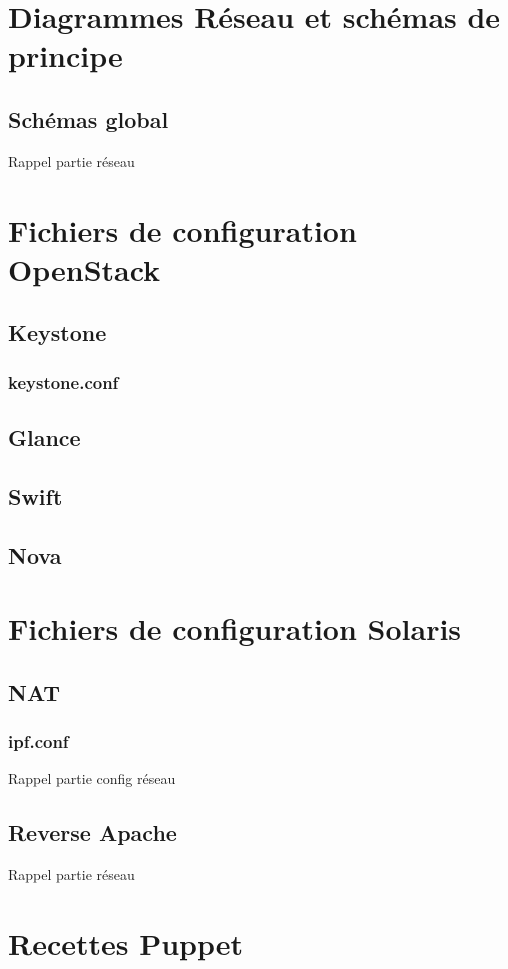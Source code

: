 \documentclass{report}
\begin{document}
\appendix
\chapter{Diagrammes Réseau et schémas de principe}
\section{Schémas global}
Rappel partie réseau

\chapter{Fichiers de configuration OpenStack}
\section{Keystone}
\subsection{keystone.conf}

\section{Glance}

\section{Swift}

\section{Nova}

\chapter{Fichiers de configuration Solaris}
\section{NAT}
\subsection{ipf.conf}
Rappel partie config réseau
\section{Reverse Apache}
Rappel partie réseau

\chapter{Recettes Puppet}
\end{document}
